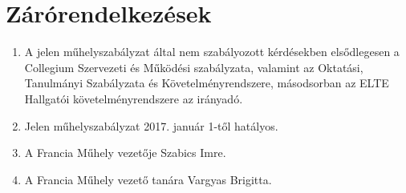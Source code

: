 \documentclass{../styles/rulebook}
\begin{document}
\section{Zárórendelkezések}

\begin{enumerate}
	\item A jelen műhelyszabályzat által nem szabályozott kérdésekben elsődlegesen a Collegium Szervezeti és Működési szabályzata, valamint az Oktatási, Tanulmányi Szabályzata és Követelményrendszere, másodsorban az ELTE Hallgatói követelményrendszere az irányadó.
	\item Jelen műhelyszabályzat 2017. január 1-től hatályos.
	\item A Francia Műhely vezetője Szabics Imre.
	\item A Francia Műhely vezető tanára Vargyas Brigitta.
\end{enumerate}
\end{document}
